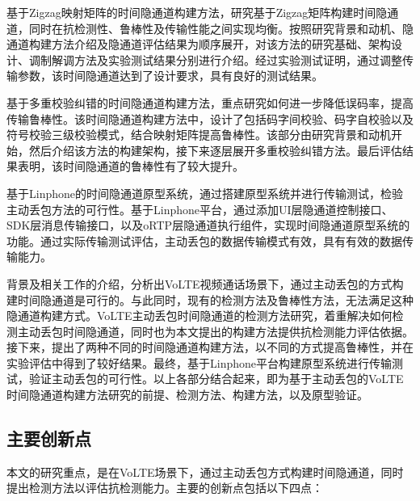 基于Zigzag映射矩阵的时间隐通道构建方法，研究基于Zigzag矩阵构建时间隐通道，同时在抗检测性、鲁棒性及传输性能之间实现均衡。按照研究背景和动机、隐通道构建方法介绍及隐通道评估结果为顺序展开，对该方法的研究基础、架构设计、调制解调方法及实验测试结果分别进行介绍。经过实验测试证明，通过调整传输参数，该时间隐通道达到了设计要求，具有良好的测试结果。

基于多重校验纠错的时间隐通道构建方法，重点研究如何进一步降低误码率，提高传输鲁棒性。该时间隐通道构建方法中，设计了包括码字间校验、码字自校验以及符号校验三级校验模式，结合映射矩阵提高鲁棒性。该部分由研究背景和动机开始，然后介绍该方法的构建架构，接下来逐层展开多重校验纠错方法。最后评估结果表明，该时间隐通道的鲁棒性有了较大提升。

基于Linphone的时间隐通道原型系统，通过搭建原型系统并进行传输测试，检验主动丢包方法的可行性。基于Linphone平台，通过添加UI层隐通道控制接口、SDK层消息传输接口，以及oRTP层隐通道执行组件，实现时间隐通道原型系统的功能。通过实际传输测试评估，主动丢包的数据传输模式有效，具有有效的数据传输能力。

背景及相关工作的介绍，分析出VoLTE视频通话场景下，通过主动丢包的方式构建时间隐通道是可行的。与此同时，现有的检测方法及鲁棒性方法，无法满足这种隐通道构建方式。VoLTE主动丢包时间隐通道的检测方法研究，着重解决如何检测主动丢包时间隐通道，同时也为本文提出的构建方法提供抗检测能力评估依据。接下来，提出了两种不同的时间隐通道构建方法，以不同的方式提高鲁棒性，并在实验评估中得到了较好结果。最终，基于Linphone平台构建原型系统进行传输测试，验证主动丢包的可行性。以上各部分结合起来，即为基于主动丢包的VoLTE时间隐通道构建方法研究的前提、检测方法、构建方法，以及原型验证。

\subsection{主要创新点}
\label{sec:intro:work:inno}

本文的研究重点，是在VoLTE场景下，通过主动丢包方式构建时间隐通道，同时提出检测方法以评估抗检测能力。主要的创新点包括以下四点：

